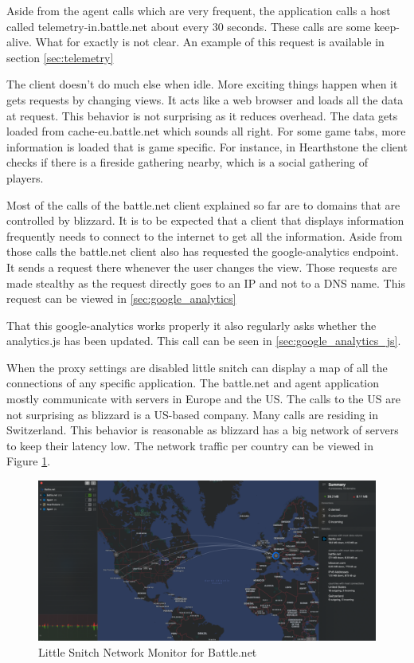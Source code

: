 \documentclass[12pt]{article}
\begin{document}
Aside from the agent calls which are very frequent, the application calls a host called telemetry-in.battle.net about every 30 seconds. These calls are some keep-alive. What for exactly is not clear. An example of this request is available in section \ref{sec:telemetry}

The client doesn't do much else when idle. More exciting things happen when it gets requests by changing views. It acts like a web browser and loads all the data at request. This behavior is not surprising as it reduces overhead. The data gets loaded from cache-eu.battle.net which sounds all right. For some game tabs, more information is loaded that is game specific. For instance, in Hearthstone the client checks if there is a fireside gathering nearby, which is a social gathering of players. 

Most of the calls of the battle.net client explained so far are to domains that are controlled by blizzard. It is to be expected that a client that displays information frequently needs to connect to the internet to get all the information. Aside from those calls the battle.net client also has requested the google-analytics endpoint. It sends a request there whenever the user changes the view. Those requests are made stealthy as the request directly goes to an IP and not to a DNS name. This request can be viewed in \ref{sec:google_analytics}

That this google-analytics works properly it also regularly asks whether the analytics.js has been updated. This call can be seen in \ref{sec:google_analytics_js}. 

When the proxy settings are disabled little snitch can display a map of all the connections of any specific application. The battle.net and agent application mostly communicate with servers in Europe and the US. The calls to the US are not surprising as blizzard is a US-based company. Many calls are residing in Switzerland. This behavior is reasonable as blizzard has a big network of servers to keep their latency low. The network traffic per country can be viewed in Figure \ref{fig:network}.

\begin{figure}[h]
  \includegraphics[width=12cm]{networkmonitor.png}
  \centering
  \caption{Little Snitch Network Monitor for Battle.net}
  \label{fig:network}
\end{figure}
\end{document}
